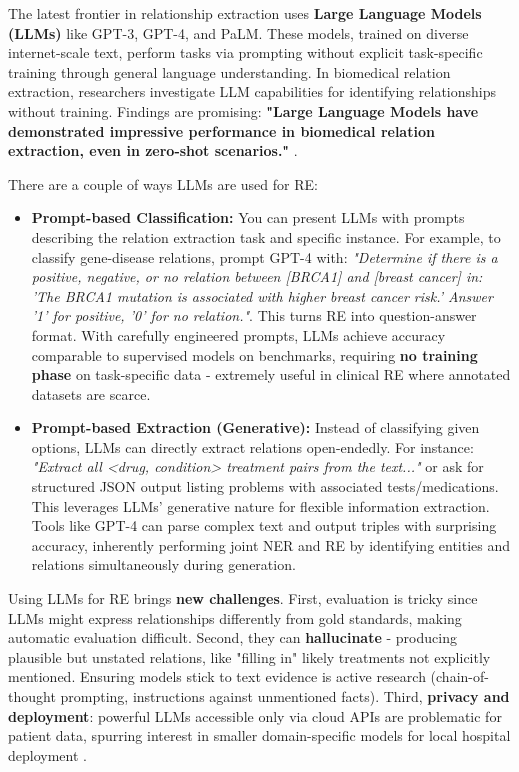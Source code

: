 The latest frontier in relationship extraction uses \textbf{Large Language Models (LLMs)} like GPT-3, GPT-4, and PaLM. These models, trained on diverse internet-scale text, perform tasks via prompting without explicit task-specific training through general language understanding. In biomedical relation extraction, researchers investigate LLM capabilities for identifying relationships without training. Findings are promising: \textbf{"Large Language Models have demonstrated impressive performance in biomedical relation extraction, even in zero-shot scenarios."} \cite{Laskar2025}.

There are a couple of ways LLMs are used for RE:

\begin{itemize}
\item \textbf{Prompt-based Classification:} You can present LLMs with prompts describing the relation extraction task and specific instance. For example, to classify gene-disease relations, prompt GPT-4 with: \emph{"Determine if there is a positive, negative, or no relation between [BRCA1] and [breast cancer] in: 'The BRCA1 mutation is associated with higher breast cancer risk.' Answer '1' for positive, '0' for no relation."}. This turns RE into question-answer format. With carefully engineered prompts, LLMs achieve accuracy comparable to supervised models on benchmarks, requiring \textbf{no training phase} on task-specific data - extremely useful in clinical RE where annotated datasets are scarce.

\item \textbf{Prompt-based Extraction (Generative):} Instead of classifying given options, LLMs can directly extract relations open-endedly. For instance: \emph{"Extract all <drug, condition> treatment pairs from the text..."} or ask for structured JSON output listing problems with associated tests/medications. This leverages LLMs' generative nature for flexible information extraction. Tools like GPT-4 can parse complex text and output triples with surprising accuracy, inherently performing joint NER and RE by identifying entities and relations simultaneously during generation.
\end{itemize}

Using LLMs for RE brings \textbf{new challenges}. First, evaluation is tricky since LLMs might express relationships differently from gold standards, making automatic evaluation difficult. Second, they can \textbf{hallucinate} - producing plausible but unstated relations, like "filling in" likely treatments not explicitly mentioned. Ensuring models stick to text evidence is active research (chain-of-thought prompting, instructions against unmentioned facts). Third, \textbf{privacy and deployment}: powerful LLMs accessible only via cloud APIs are problematic for patient data, spurring interest in smaller domain-specific models for local hospital deployment \parencite{Ji2023}.

